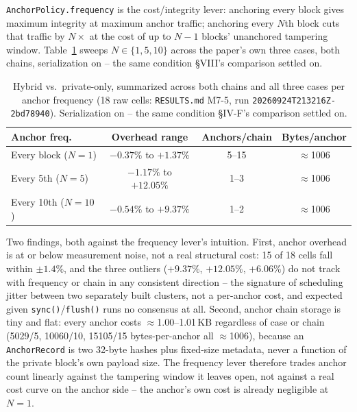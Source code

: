 \documentclass[conference]{IEEEtran}
\begin{document}
\texttt{AnchorPolicy.frequency} is the cost/integrity lever: anchoring every block gives maximum
integrity at maximum anchor traffic; anchoring every $N$th block cuts that traffic by $N\times$ at
the cost of up to $N{-}1$ blocks' unanchored tampering window. Table~\ref{tab:m7-5-matrix} sweeps
$N \in \{1, 5, 10\}$ across the paper's own three cases, both chains, serialization on -- the same
condition \S VIII's comparison settled on.

\begin{table}[t]
\centering
\caption{Hybrid vs.\ private-only, summarized across both chains and all three cases per anchor
frequency (18 raw cells: \texttt{RESULTS.md} M7-5, run \texttt{20260924T213216Z-2bd78940}).
Serialization on -- the same condition \S IV-F's comparison settled on.}
\label{tab:m7-5-matrix}
\footnotesize
\begin{tabular}{lccc}
\hline
\textbf{Anchor freq.} & \textbf{Overhead range} & \textbf{Anchors/chain} & \textbf{Bytes/anchor} \\
\hline
Every block ($N{=}1$)  & $-0.37\%$ to $+1.37\%$  & 5--15 & $\approx$1006 \\
Every 5th ($N{=}5$)    & $-1.17\%$ to $+12.05\%$ & 1--3  & $\approx$1006 \\
Every 10th ($N{=}10$)  & $-0.54\%$ to $+9.37\%$  & 1--2  & $\approx$1006 \\
\hline
\end{tabular}
\end{table}

Two findings, both against the frequency lever's intuition. First, anchor overhead is at or below
measurement noise, not a real structural cost: 15 of 18 cells fall within $\pm 1.4\%$, and the
three outliers ($+9.37\%$, $+12.05\%$, $+6.06\%$) do not track with frequency or chain in any
consistent direction -- the signature of scheduling jitter between two separately built clusters,
not a per-anchor cost, and expected given \texttt{sync()}/\texttt{flush()} runs no consensus at
all. Second, anchor chain storage is tiny and flat: every anchor costs
$\approx$1.00--1.01\,KB regardless of case or chain (5029/5, 10060/10, 15105/15 bytes-per-anchor
all $\approx$1006), because an \texttt{AnchorRecord} is two 32-byte hashes plus fixed-size
metadata, never a function of the private block's own payload size. The frequency lever therefore
trades anchor count linearly against the tampering window it leaves open, not against a real
cost curve on the anchor side -- the anchor's own cost is already negligible at $N{=}1$.
\end{document}
